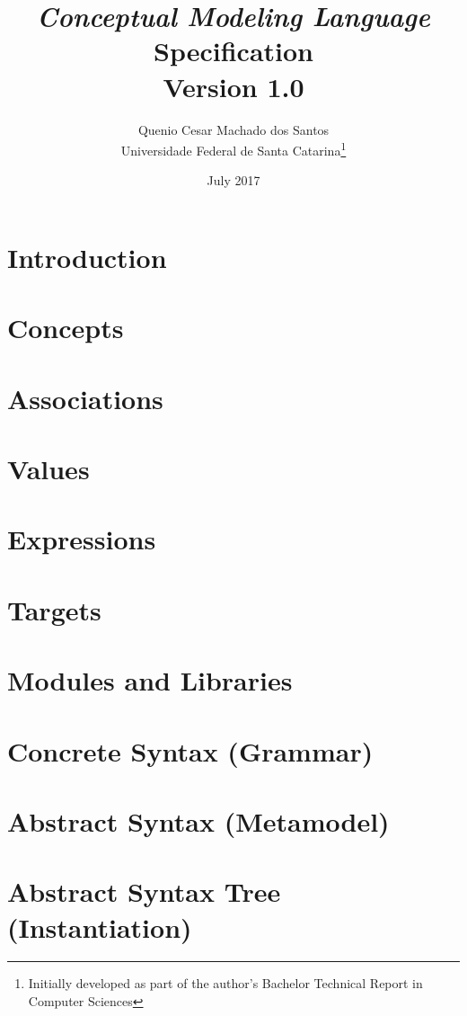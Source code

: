 \documentclass[a4paper,oneside,14pt, extrafontsizes]{memoir}
\title{\emph{Conceptual Modeling Language}\\Specification\\ \small{Version 1.0}}
\author{Quenio Cesar Machado dos Santos\\
\small{Universidade Federal de Santa Catarina}\thanks{
Initially developed as part of the author's Bachelor Technical Report in Computer Sciences}}
\date{July 2017}
\begin{document}
\begin{titlingpage}
\maketitle
\end{titlingpage}

\frontmatter

\begin{KeepFromToc}

\clearpage
\tableofcontents

\clearpage
\listoffigures

\clearpage
\listoftables 

\end{KeepFromToc}

\mainmatter

\chapter{Introduction}

\chapter{Concepts}



\chapter{Associations}



\chapter{Values}

\chapter{Expressions}

\chapter{Targets}

\chapter{Modules and Libraries}

\appendix

\chapter{Concrete Syntax (Grammar)}



\chapter{Abstract Syntax (Metamodel)}



\chapter{Abstract Syntax Tree (Instantiation)}



\backmatter
\end{document}
